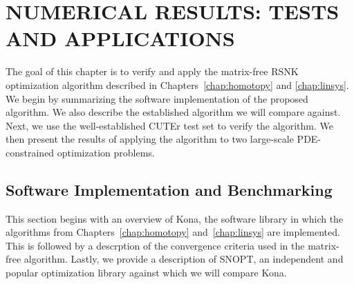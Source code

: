  
\chapter{NUMERICAL RESULTS: TESTS AND APPLICATIONS}\label{chap:tests}
The goal of this chapter is to verify and apply the matrix-free RSNK optimization algorithm described in Chapters~\ref{chap:homotopy} and \ref{chap:linsys}.   We begin by summarizing the software implementation of the proposed algorithm.  We also describe the established algorithm we will compare against.  Next, we use the well-established CUTEr test set to verify the algorithm.  We then present the results of applying the algorithm to two large-scale PDE-constrained optimization problems.



\section{Software Implementation and Benchmarking}

This section begins with an overview of Kona, the software library in which the algorithms from Chapters~\ref{chap:homotopy} and~\ref{chap:linsys} are implemented.  This is followed by a descrption of the convergence criteria used in the matrix-free algorithm. Lastly, we provide a description of SNOPT, an independent and popular optimization library against which we will compare Kona.

